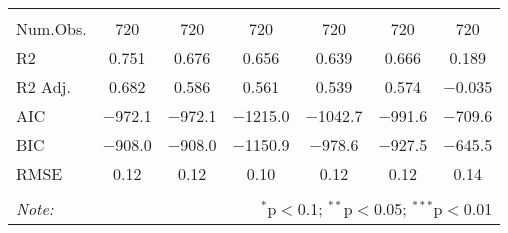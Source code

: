 \begin{table}[!htbp]
\begin{tabular}{@{\extracolsep{-3pt}}lcccccc}
\hline \\[-1.8ex] 
Num.Obs. & \num{720} & \num{720} & \num{720} & \num{720} & \num{720} & \num{720}\\
R2 & \num{0.751} & \num{0.676} & \num{0.656} & \num{0.639} & \num{0.666} & \num{0.189}\\
R2 Adj. & \num{0.682} & \num{0.586} & \num{0.561} & \num{0.539} & \num{0.574} & \num{-0.035}\\
AIC & \num{-972.1} & \num{-972.1} & \num{-1215.0} & \num{-1042.7} & \num{-991.6} & \num{-709.6}\\
BIC & \num{-908.0} & \num{-908.0} & \num{-1150.9} & \num{-978.6} & \num{-927.5} & \num{-645.5}\\
RMSE & \num{0.12} & \num{0.12} & \num{0.10} & \num{0.12} & \num{0.12} & \num{0.14}\\
\bottomrule
\hline \\[-1.8ex] 
\textit{Note:}  & \multicolumn{6}{r}{$^{*}$p$<$0.1; $^{**}$p$<$0.05; $^{***}$p$<$0.01} \\ 
\end{tabular} 
\end{table} 


